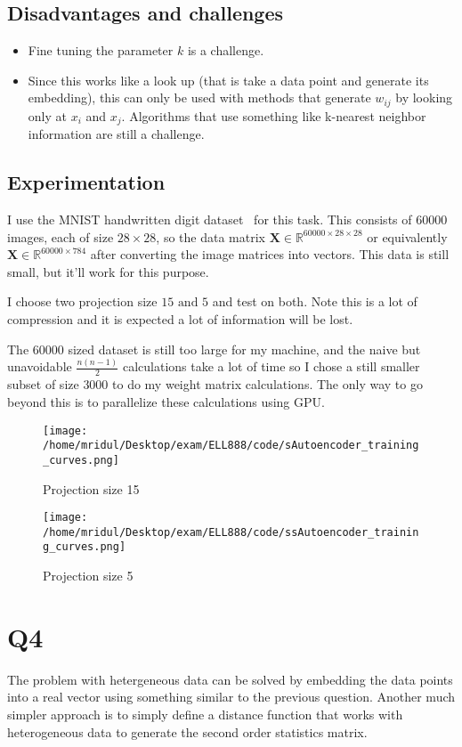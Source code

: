 \documentclass[11pt]{article}
\begin{document}
\subsection{Disadvantages and challenges}
\label{sec:org0a859e6}
\begin{itemize}
\item Fine tuning the parameter \(k\) is a challenge.
\item Since this works like a look up (that is take a data point and
generate its embedding), this can only be used with methods that
generate \(w_{ij}\) by looking only at \(x_i\) and
\(x_j\). Algorithms that use something like k-nearest neighbor
information are still a challenge.
\end{itemize}
\subsection{Experimentation}
\label{sec:org74c0d6b}
I use the MNIST handwritten digit dataset~\cite{MNIST} for this
task. This consists of \(60000\) images, each of size \(28\times 28\), so
the data matrix \(\mathbf{X}\in\mathbb{R}^{60000\times 28\times 28}\)
or equivalently \(\mathbf{X}\in\mathbb{R}^{60000\times 784}\) after
converting the image matrices into vectors. This data is still small,
but it'll work for this purpose.\par
I choose two projection size \(15\text{ and }5\) and test on
both. Note this is a lot of compression and it is expected a lot of
information will be lost.\par
The \(60000\) sized dataset is still too large for my machine, and the
naive but unavoidable \(\displaystyle\frac{n(n-1)}{2}\) calculations take a lot of
time so I chose a still smaller subset of size \(3000\) to do my
weight matrix calculations. The only way to go beyond this is to
parallelize these calculations using GPU.
\begin{figure}[!htbp]
\centering
\texttt{[image: /home/mridul/Desktop/exam/ELL888/code/sAutoencoder\_training\_curves.png]}
\caption{Projection size 15}
\end{figure}
\begin{figure}[!htbp]
\centering
\texttt{[image: /home/mridul/Desktop/exam/ELL888/code/ssAutoencoder\_training\_curves.png]}
\caption{Projection size 5}
\end{figure}
\clearpage
\section{Q4}
\label{sec:orga751ec2}
The problem with hetergeneous data can be solved by embedding the data
points into a real vector using something similar to the previous
question. Another much simpler approach is to simply define a distance
function that works with heterogeneous data to generate the second
order statistics matrix.\par
\end{document}
